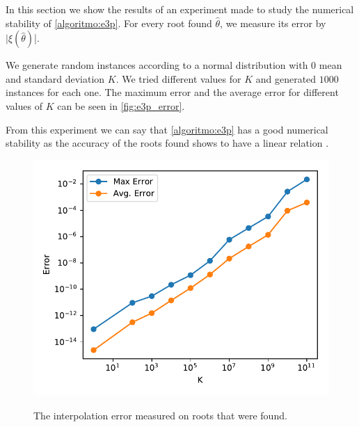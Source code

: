In this section we show the results of an experiment made to study the numerical stability of \autoref{algoritmo:e3p}.
For every root found $\hat{\theta}$, we measure its error by $|\xi(\hat{\theta})$|.

We generate random instances according to a normal distribution with $0$ mean and standard deviation $K$. We tried different values for $K$ and generated $1000$ instances for each one. The maximum error and the average error for different values of $K$ can be seen in \autoref{fig:e3p_error}.

From this experiment we can say that \autoref{algoritmo:e3p} has a good numerical stability as the accuracy of the roots found shows to have a linear relation .

\begin{figure}
	\centering
	\caption{The interpolation error measured on roots that were found.}
	\includegraphics{tex/figures/e3p_error}
	\fautor
	\label{fig:e3p_error}
\end{figure}